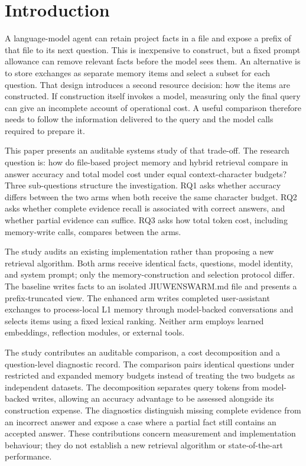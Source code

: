 \section{Introduction}

\label{sec:introduction}

A language-model agent can retain project facts in a file and expose a prefix of that file to its next question. This is inexpensive to construct, but a fixed prompt allowance can remove relevant facts before the model sees them. An alternative is to store exchanges as separate memory items and select a subset for each question. That design introduces a second resource decision: how the items are constructed. If construction itself invokes a model, measuring only the final query can give an incomplete account of operational cost. A useful comparison therefore needs to follow the information delivered to the query and the model calls required to prepare it.

This paper presents an auditable systems study of that trade-off. The research question is: how do file-based project memory and hybrid retrieval compare in answer accuracy and total model cost under equal context-character budgets? Three sub-questions structure the investigation. RQ1 asks whether accuracy differs between the two arms when both receive the same character budget. RQ2 asks whether complete evidence recall is associated with correct answers, and whether partial evidence can suffice. RQ3 asks how total token cost, including memory-write calls, compares between the arms.

The study audits an existing implementation rather than proposing a new retrieval algorithm. Both arms receive identical facts, questions, model identity, and system prompt; only the memory-construction and selection protocol differ. The baseline writes facts to an isolated JIUWENSWARM.md file and presents a prefix-truncated view. The enhanced arm writes completed user-assistant exchanges to process-local L1 memory through model-backed conversations and selects items using a fixed lexical ranking. Neither arm employs learned embeddings, reflection modules, or external tools.

The study contributes an auditable comparison, a cost decomposition and a question-level diagnostic record. The comparison pairs identical questions under restricted and expanded memory budgets instead of treating the two budgets as independent datasets. The decomposition separates query tokens from model-backed writes, allowing an accuracy advantage to be assessed alongside its construction expense. The diagnostics distinguish missing complete evidence from an incorrect answer and expose a case where a partial fact still contains an accepted answer. These contributions concern measurement and implementation behaviour; they do not establish a new retrieval algorithm or state-of-the-art performance.

